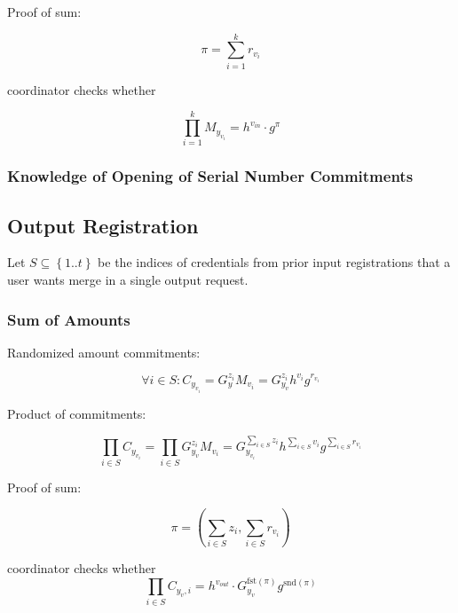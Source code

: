 \documentclass{article}
\begin{document}
Proof of sum:

\[ \pi=\sum_{i=1}^{k} r_{v_i} \]

coordinator checks whether 

\[ \prod_{i=1}^{k} M_{y_{v_i}}
= h^{v_{\mathit{in}}} \cdot g^\pi
\]


\subsubsection{Knowledge of Opening of Serial Number Commitments}

\subsection{Output Registration}

Let $S \subseteq \left\{1..t\right\}$ be the indices of credentials from prior input registrations that a user wants merge in a single output request.

\subsubsection{Sum of Amounts}

Randomized amount commitments:

\[ \forall i \in S: C_{y_{v_i}}=G^{z_i}_{y}M_{v_i}=G^{z_i}_{y_{v}}h^{v_i}g^{r_{v_i}} \]

Product of commitments:

\[\prod_{i \in S} C_{y_{v_i}}
= \prod_{i \in S} G^{z_i}_{y_v}M_{v_i}
= G^{\sum_{i \in S} z_i}_{y_{v_i}}h^{\sum_{i \in S} v_i}g^{\sum_{i \in S} r_{v_i}}
\]

Proof of sum:

\[ \pi=\left(\sum_{i \in S}z_i,\sum_{i \in S}r_{v_i}\right) \]


coordinator checks whether %
\[ \prod_{i \in S} C_{y_{v},i}=h^{v_{\mathit{out}}} \cdot G_{y_{v}}^{\mathrm{fst}(\pi)} g^{\mathrm{snd}(\pi)} \]


\end{document}
